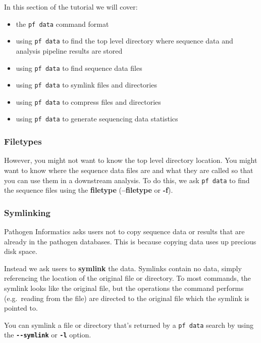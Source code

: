 \documentclass[11pt]{article}
\providecommand{\tightlist}{%
      \setlength{\itemsep}{0pt}\setlength{\parskip}{0pt}}
\begin{document}
In this section of the tutorial we will cover:

\begin{itemize}
\tightlist
\item
  the \texttt{pf\ data} command format
\item
  using \texttt{pf\ data} to find the top level directory where sequence
  data and analysis pipeline results are stored
\item
  using \texttt{pf\ data} to find sequence data files
\item
  using \texttt{pf\ data} to symlink files and directories
\item
  using \texttt{pf\ data} to compress files and directories
\item
  using \texttt{pf\ data} to generate sequencing data statistics
\end{itemize}

\hypertarget{filetypes}{%
\subsubsection{Filetypes}\label{filetypes}}

However, you might not want to know the top level directory location.
You might want to know where the sequence data files are and what they
are called so that you can use them in a downstream analysis. To do
this, we ask \texttt{pf\ data} to find the sequence files using the
\textbf{filetype} (\textbf{--filetype} or \textbf{-f}).

\hypertarget{symlinking}{%
\subsubsection{Symlinking}\label{symlinking}}

Pathogen Informatics asks users not to copy sequence data or results
that are already in the pathogen databases. This is because copying data
uses up precious disk space.

Instead we ask users to \textbf{symlink} the data. Symlinks contain no
data, simply referencing the location of the original file or directory.
To most commands, the symlink looks like the original file, but the
operations the command performs (e.g.~reading from the file) are
directed to the original file which the symlink is pointed to.

You can symlink a file or directory that's returned by a
\texttt{pf\ data} search by using the \textbf{\texttt{-\/-symlink}} or
\textbf{\texttt{-l}} option.
\end{document}
